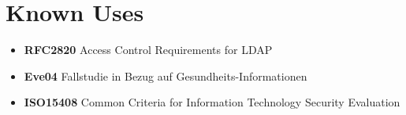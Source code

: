 \section{Known Uses}

\begin{itemize}
  \item \textbf{RFC2820} Access Control Requirements for LDAP
  \item \textbf{Eve04} Fallstudie in Bezug auf Gesundheits-Informationen
  \item \textbf{ISO15408} Common Criteria for Information Technology Security Evaluation
\end{itemize}


